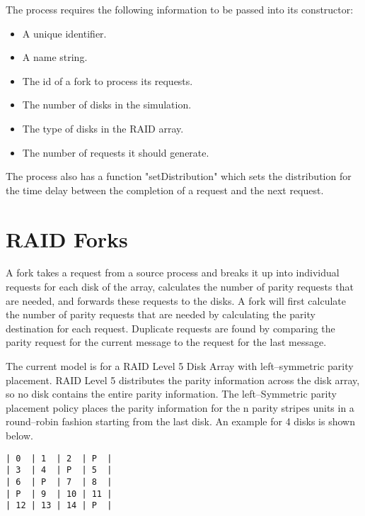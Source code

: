\documentclass[11pt]{report}
\begin{document}
The process requires the following information to be passed into its
constructor:

\begin{itemize}
\item
A unique identifier.

\item
A name string. 

\item
The id of a fork to process its requests.

\item
The number of disks in the simulation.

\item
The type of disks in the RAID array.

\item
The number of requests it should generate.

\end{itemize}

The process also has a function "setDistribution" which sets the
distribution for the time delay between the completion of a request and
the next request.

\chapter{RAID Forks}

A fork takes a request from a source process and breaks it up into
individual requests for each disk of the array, calculates the number of
parity requests that are needed, and forwards these requests to the
disks.  A fork will first calculate the number of parity requests that
are needed by calculating the parity destination for each request.
Duplicate requests are found by comparing the parity request for the
current message to the request for the last message.

The current model is for a RAID Level 5 Disk Array with left--symmetric
parity placement.  RAID Level 5 distributes the parity information
across the disk array, so no disk contains the entire parity
information.  The left--Symmetric parity placement policy places the
parity information for the n parity stripes units in a round--robin
fashion starting from the last disk.  An example for 4 disks is shown
below.

\begin{verbatim}
| 0  | 1  | 2  | P  |
| 3  | 4  | P  | 5  |
| 6  | P  | 7  | 8  |
| P  | 9  | 10 | 11 |
| 12 | 13 | 14 | P  |
\end{verbatim}
\end{document}
